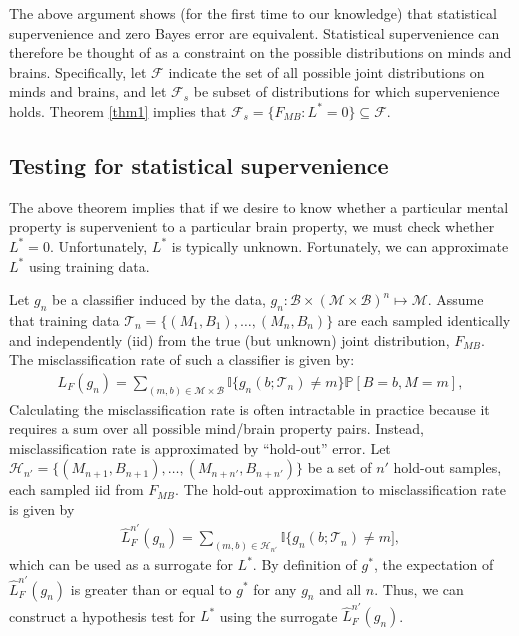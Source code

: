 \documentclass{article}
\newcommand{\mB}{\mathcal{B}}
\newcommand{\mM}{\mathcal{M}}
\newcommand{\PP}{\mathbb{P}}           %
\newcommand{\EE}{\mathbb{E}}           %
\newcommand{\II}{\mathbb{I}}           %
\providecommand{\mc}[1]{\mathcal{#1}}
\newcommand{\hL}{\widehat{L}}
\begin{document}
The above argument shows (for the first time to our knowledge) that statistical supervenience and zero Bayes error are equivalent. Statistical supervenience can therefore be thought of as a constraint on the possible distributions on minds and brains.  Specifically, let $\mc{F}$ indicate the set of all possible joint distributions on minds and brains, and let $\mc{F}_s$ be subset of distributions for which supervenience holds. Theorem \ref{thm1} implies that $\mc{F}_s = \{F_{MB} : L^*=0\} \subseteq \mc{F}$.


\subsection*{Testing for statistical supervenience} %
\label{sub:subsection_name}


The above theorem implies that if we desire to know whether a particular mental property is supervenient to a particular brain property, we must check whether $L^*=0$.  Unfortunately, $L^*$ is typically unknown.  Fortunately, we can approximate $L^*$ using training data.


Let $g_n$ be a classifier induced by the data, $g_n:\mB \times (\mc{M} \times \mc{B})^n \mapsto \mM$.   Assume that training data $\mc{T}_n=\{(M_{1},B_{1}), \ldots, (M_{n},B_{n})\}$ are each sampled identically and independently (iid) from the true (but unknown) joint distribution, $F_{MB}$.  The misclassification rate of such a classifier is given by:
\begin{align}
L_F(g_n)=\sum_{(m,b)  \in \mc{M}\times \mc{B}} \II\{g_n(b; \mc{T}_n) \neq m\} \PP[B=b,M=m],
\end{align}
Calculating the misclassification rate is often intractable in practice because it requires a sum over all possible mind/brain property pairs.  Instead, misclassification rate is approximated by ``hold-out'' error.  Let $\mc{H}_{n'}=\{(M_{n+1},B_{n+1}), \ldots, (M_{n+n'},B_{n+n'})\}$ be a set of $n'$ hold-out samples, each sampled iid from $F_{MB}$.  The hold-out approximation to misclassification rate is given by
\begin{align}
\hL^{n'}_{F}(g_{n}) = \sum_{(m,b) \in \mc{H}_{n'}}\II \{g_{n}(b; \mc{T}_{n})\neq m], %
\end{align}
which can be used as a surrogate for $L^*$. 
By definition of $g^*$, the expectation of $\hL^{n'}_F(g_n)$ is greater than or equal to $g^*$ for any $g_n$ and all $n$.  Thus, we can construct a hypothesis test for $L^*$ using the surrogate $\hL^{n'}_F(g_n)$.  
\end{document}
